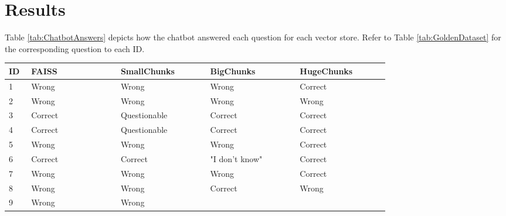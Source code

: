 \section{Results}
Table \ref{tab:ChatbotAnswers} depicts how the chatbot answered each question for each vector store. Refer to 
Table \ref{tab:GoldenDataset} for the corresponding question to each ID.

\begin{longtable}{ | p{0.05\linewidth} | p{0.2\linewidth} | p{0.2\linewidth} | p{0.2\linewidth} | p{0.2\linewidth} | }
    \hline
    \cellcolor{blue!25} ID & \cellcolor{blue!25} FAISS & \cellcolor{blue!25} SmallChunks & \cellcolor{blue!25} BigChunks & \cellcolor{blue!25}HugeChunks \\
    \hline
    \cellcolor{blue!25} 1 & \cellcolor{red!25} Wrong & \cellcolor{red!25} Wrong  
                          & \cellcolor{red!25} Wrong & \cellcolor{green!25} Correct\\
    \hline
    \cellcolor{blue!25} 2 & \cellcolor{red!25} Wrong & \cellcolor{red!25} Wrong
                          & \cellcolor{red!25} Wrong & \cellcolor{red!25} Wrong\\
    \hline 
    \cellcolor{blue!25} 3 & \cellcolor{green!25} Correct & \cellcolor{yellow!25} Questionable
                          & \cellcolor{green!25} Correct & \cellcolor{green!25} Correct\\
    \hline 
    \cellcolor{blue!25} 4 & \cellcolor{green!25} Correct & \cellcolor{yellow!25} Questionable 
                          & \cellcolor{green!25} Correct & \cellcolor{green!25} Correct \\
    \hline 
    \cellcolor{blue!25} 5 & \cellcolor{red!25} Wrong & \cellcolor{red!25} Wrong 
                          & \cellcolor{red!25} Wrong & \cellcolor{green!25} Correct\\
    \hline 
    \cellcolor{blue!25} 6 & \cellcolor{green!25} Correct & \cellcolor{green!25} Correct 
                          & \cellcolor{red!40} "I don't know" & \cellcolor{green!25} Correct\\
    \hline 
    \cellcolor{blue!25} 7 & \cellcolor{red!25} Wrong & \cellcolor{red!25} Wrong 
                          & \cellcolor{red!25} Wrong & \cellcolor{green!25} Correct \\
    \hline 
    \cellcolor{blue!25} 8 & \cellcolor{red!25} Wrong & \cellcolor{red!25} Wrong
                          & \cellcolor{green!25} Correct & \cellcolor{red!25} Wrong \\
    \hline
    \cellcolor{blue!25} 9 & \cellcolor{red!25} Wrong & \cellcolor{red!25} Wrong

\end{longtable}
